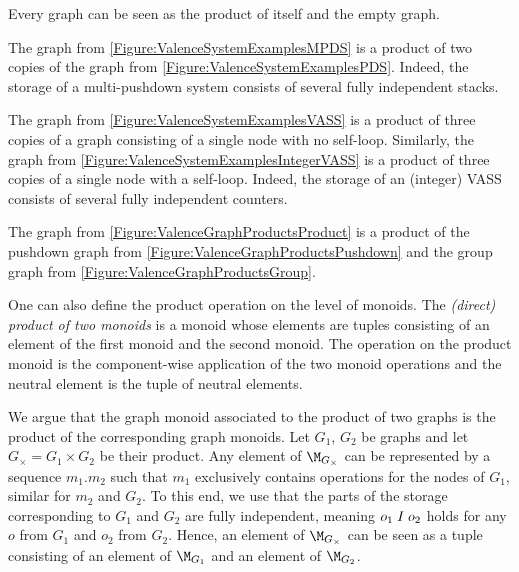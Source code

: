 \documentclass[../../diss.tex]{subfiles}
\begin{document}
\begin{example}
    \begin{thmenumerate}[a)]
        \item
            Every graph can be seen as the product of itself and the empty graph.
        \item
            The graph from \cref{Figure:ValenceSystemExamplesMPDS} is a product of two copies of the graph from \cref{Figure:ValenceSystemExamplesPDS}.
            Indeed, the storage of a multi-pushdown system consists of several fully independent stacks.
        \item
            The graph from \cref{Figure:ValenceSystemExamplesVASS} is a product of three copies of a graph consisting of a single node with no self-loop.
            Similarly, the graph from \cref{Figure:ValenceSystemExamplesIntegerVASS} is a product of three copies of a single node with a self-loop.
            Indeed, the storage of an (integer) VASS consists of several fully independent counters.
        \item
            The graph from \cref{Figure:ValenceGraphProductsProduct} is a product of the pushdown graph from \cref{Figure:ValenceGraphProductsPushdown} and the group graph from \cref{Figure:ValenceGraphProductsGroup}.
    \end{thmenumerate}
\end{example}

\begin{remark*}
    One can also define the product operation on the level of monoids.
    The \emph{(direct) product of two monoids} is a monoid whose elements are tuples consisting of an element of the first monoid and the second monoid.
    The operation on the product monoid is the component-wise application of the two monoid operations and the neutral element is the tuple of neutral elements.

    We argue that the graph monoid associated to the product of two graphs is the product of the corresponding graph monoids.
    Let $G_1$, $G_2$ be graphs and let $G_\times = G_1 \times G_2$ be their product.
    Any element of $\graphmonoid{G_\times}$ can be represented by a sequence $m_1.m_2$ such that $m_1$ exclusively contains operations for the nodes of $G_1$, similar for $m_2$ and $G_2$.
    To this end, we use that the parts of the storage corresponding to $G_1$ and $G_2$ are fully independent, meaning $o_1 \mathrel{I} o_2$ holds for any $o$ from $G_1$ and $o_2$ from $G_2$.
    Hence, an element of $\graphmonoid{G_\times}$ can be seen as a tuple consisting of an element of $\graphmonoid{G_1}$ and an element of $\graphmonoid{G_2}$.
\end{remark*}
\end{document}
